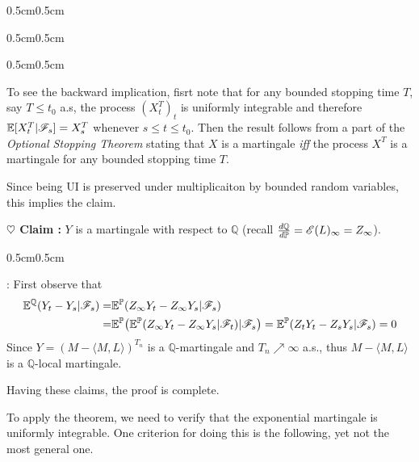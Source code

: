 \documentclass[10pt,a4paper]{article}
\newenvironment{proof}
{\begin{changemargin}{0.5cm}{0.5cm} 
	}%
	{\end{changemargin}
}
\newenvironment{subproof}
{\begin{changemargin}{0.5cm}{0.5cm} 
	}%
	{\end{changemargin}
}
\newenvironment{p}
{\begin{proof} 
	}%
	{\end{proof}
}
\begin{document}
\begin{p}
\begin{subproof}
\begin{subproof}
\quad To see the backward implication, fisrt note that for any bounded stopping time $T$, say $T\leq t_0$ a.s, the process $(X^T_t)_t$ is uniformly integrable and therefore $\mathbb{E}[X^T_t | \mathscr{F}_s] = X^T_s$ whenever $s\leq t\leq t_0$. Then the result follows from a part of the \emph{Optional Stopping Theorem} stating that $X$ is a martingale \emph{iff} the process $X^T$ is a martingale for any bounded stopping time $T$.
\end{subproof}
Since being UI is preserved under multiplicaiton by bounded random variables, this implies the claim.
\end{subproof}

\textbf{$\heartsuit$ Claim :} $Y$ is a martingale with respect to $\mathbb{Q}$ (recall $\frac{d \mathbb{Q}}{d \mathbb{P}} = \mathscr{E} (L)_{\infty} = Z_{\infty}$).
\begin{subproof}
: First observe that
\begin{align*}
\mathbb{E}^{\mathbb{Q}}(Y_t - Y_s | \mathscr{F}_s) =& \mathbb{E}^{\mathbb{P}}(Z_{\infty}Y_t - Z_{\infty} Y_s |\mathscr{F}_s ) \\
=& \mathbb{E}^{\mathbb{P}}\big( \mathbb{E}^{\mathbb{P}}(Z_{\infty}Y_t - Z_{\infty} Y_s |\mathscr{F}_t ) | \mathscr{F}_s \big) = \mathbb{E}^{\mathbb{P}} (Z_t Y_t - Z_s Y_s | \mathscr{F}_s) =0
\end{align*}
Since $Y = (M - \langle M, L \rangle)^{T_n}$ is a $\mathbb{Q}$-martingale and $T_n \nearrow \infty$ a.s., thus $M - \langle M, L \rangle$ is a $\mathbb{Q}$-local martingale.
\end{subproof}
Having these claims, the proof is complete.

\eop
\end{p}
\s

To apply the theorem, we need to verify that the exponential martingale is uniformly integrable. One criterion for doing this is the following, yet not the most general one.
\s
\end{document}
